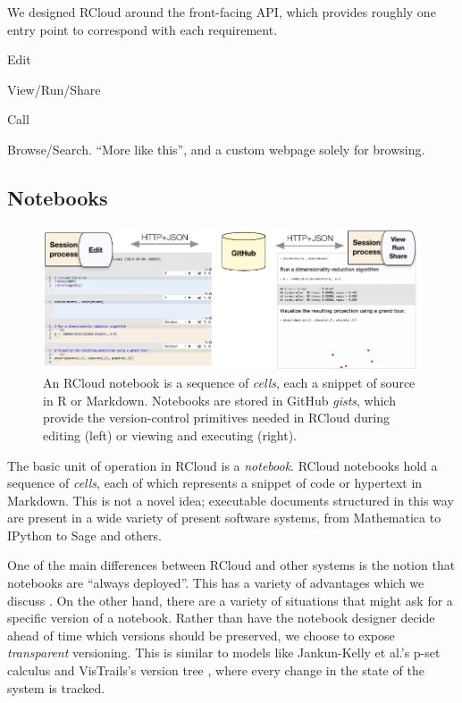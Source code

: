 We designed RCloud around the front-facing API, which provides roughly
one entry point to correspond with each requirement.

Edit

View/Run/Share

Call

Browse/Search. ``More like this'', and a custom webpage solely for browsing.

\subsection{Notebooks\label{sec:notebooks}}

\begin{figure}
\includegraphics[width=\linewidth]{fig/notebook/notebook.pdf}
\caption{\label{fig:notebook}An RCloud notebook is a sequence of
  \emph{cells}, each a snippet of source in R or Markdown. Notebooks
  are stored in GitHub \emph{gists}, which provide the version-control
  primitives needed in RCloud during editing (left) or viewing and
  executing (right).}
\end{figure}

The basic unit of operation in RCloud is a \emph{notebook}. RCloud
notebooks hold a sequence of \emph{cells}, each of which represents a
snippet of code or hypertext in Markdown. This is not a novel idea;
executable documents structured in this way are present in a wide
variety of present software systems, from Mathematica to IPython to
Sage and others.

One of the main differences between RCloud and other systems is the
notion that notebooks are ``always deployed''. This has a variety of
advantages which we discuss . On the other hand, there
are a variety of situations that might ask for a specific version of a
notebook. Rather than have the notebook designer decide ahead of time
which versions should be preserved, we choose to expose
\emph{transparent} versioning. This is similar to models like
Jankun-Kelly et al.'s p-set calculus  and VisTrails's
version tree , where every change in the state of the
system is tracked.

